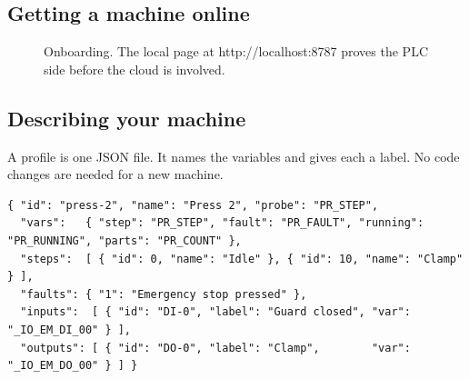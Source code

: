\documentclass[a4paper,10.5pt]{article}
\newcommand{\code}[1]{{\ttfamily\small #1}}
\begin{document}
\subsection{Getting a machine online}
\begin{figure}[H]\centering
{}
\caption{Onboarding. The local page at \code{http://localhost:8787} proves the PLC side before the cloud is involved.}
\end{figure}

\subsection{Describing your machine}\label{sec:profile}
A profile is one JSON file. It names the variables and gives each a label. No code changes are needed for a
new machine.
\begin{lstlisting}
{ "id": "press-2", "name": "Press 2", "probe": "PR_STEP",
  "vars":   { "step": "PR_STEP", "fault": "PR_FAULT", "running": "PR_RUNNING", "parts": "PR_COUNT" },
  "steps":  [ { "id": 0, "name": "Idle" }, { "id": 10, "name": "Clamp" } ],
  "faults": { "1": "Emergency stop pressed" },
  "inputs":  [ { "id": "DI-0", "label": "Guard closed", "var": "_IO_EM_DI_00" } ],
  "outputs": [ { "id": "DO-0", "label": "Clamp",        "var": "_IO_EM_DO_00" } ] }
\end{lstlisting}
\end{document}

